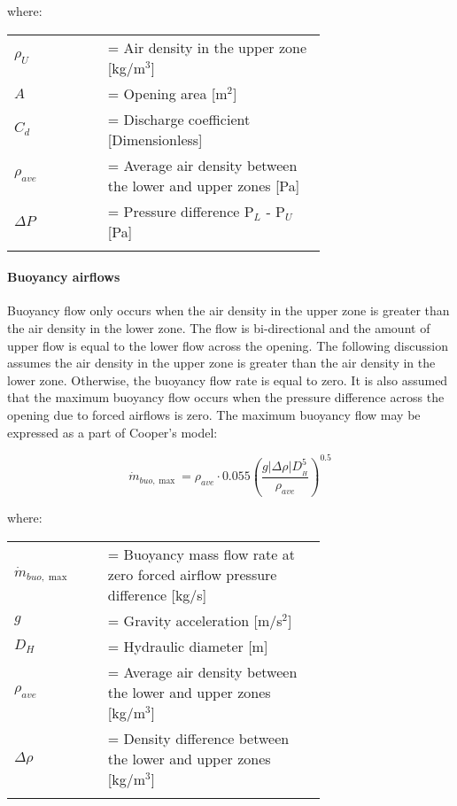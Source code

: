 where:

\begin{tabular}{lp{0.7\linewidth}}
\\
$\rho_U$ &= Air density in the upper zone [kg/m\(^{3}\)]\\
$A$ &= Opening area [m\(^{2}\)] \\
$C_{d}$ &= Discharge coefficient [Dimensionless] \\
$\rho_{ave}$ &= Average air density between the lower and upper zones [Pa] \\
$\Delta P$ &= Pressure difference P\(_{L}\) - P\(_{U}\) [Pa] \\
\\
\end{tabular}

\paragraph{Buoyancy airflows}\label{buoyancy-airflows}

Buoyancy flow only occurs when the air density in the upper zone is greater than the air density in the lower zone. The flow is bi-directional and the amount of upper flow is equal to the lower flow across the opening. The following discussion assumes the air density in the upper zone is greater than the air density in the lower zone. Otherwise, the buoyancy flow rate is equal to zero. It is also assumed that the maximum buoyancy flow occurs when the pressure difference across the opening due to forced airflows is zero. The maximum buoyancy flow may be expressed as a part of Cooper's model:

\begin{equation}
\dot{m}_{buo,\max} = {\rho_{ave}}\cdot0.055{\left( {\frac{{g\left| {\Delta \rho } \right|D_{_H}^5}}{{{\rho_{ave}}}}} \right)^{0.5}}
\end{equation}

where:

\begin{tabular}{lp{0.7\linewidth}}
\\
$\dot{m}_{buo,\max}$ &= Buoyancy mass flow rate at zero forced airflow pressure difference [kg/s]\\
$g$ &= Gravity acceleration [m/s\(^{2}\)]\\
$D_H$ &= Hydraulic diameter [m] \\
$\rho_{ave}$ &= Average air density between the lower and upper zones [kg/m\(^{3}\)]\\
$\Delta \rho$ &= Density difference between the lower and upper zones [kg/m\(^{3}\)]\\
\\
\end{tabular}

